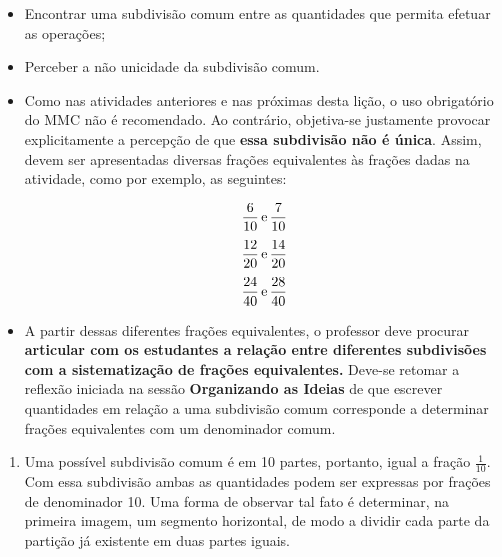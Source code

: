 \begin{multicols}{2}
\begin{solucao}{}{}
\end{solucao}
\Bg

\begin{objetivos}[label=chap5-ativ5]{}{}

  \begin{itemize} %
    \item       Encontrar uma subdivisão comum entre as quantidades que permita efetuar as operações;
    \item       Perceber a não unicidade da subdivisão comum.
\end{itemize} %
\end{objetivos}

\begin{orientacoes}{}{}

  \begin{itemize} %
    \item       Como nas atividades anteriores e nas próximas desta lição, o uso obrigatório do MMC não é recomendado. Ao contrário, objetiva-se justamente provocar explicitamente a percepção de que       {\bf essa subdivisão não é única}. Assim, devem ser apresentadas diversas frações equivalentes às frações dadas na atividade, como por exemplo, as seguintes:

  $$\frac{6}{10} \,{\rm e} \, \frac{7}{10}$$
  $$\frac{12}{20} \,{\rm e} \, \frac{14}{20}$$
  $$\frac{24}{40} \,{\rm e} \, \frac{28}{40}$$

    \item       A partir dessas diferentes frações equivalentes, o professor deve procurar       {\bf articular com os estudantes a relação entre diferentes subdivisões com a sistematização de frações equivalentes.}       Deve-se retomar a reflexão iniciada na sessão       {\bf Organizando as Ideias}       de que escrever quantidades em relação a uma subdivisão comum corresponde a determinar frações equivalentes com um denominador comum.
\end{itemize} %
\end{orientacoes}


\begin{solucao}{}{}
\begin{enumerate} [\quad a)] %
    \item       Uma possível subdivisão comum é em 10 partes, portanto, igual a fração       $\frac{1}{10}$. Com essa subdivisão ambas as quantidades podem ser expressas por frações de denominador 10. Uma forma de observar tal fato é determinar, na primeira imagem, um segmento horizontal, de modo a dividir cada parte da partição já existente em duas partes iguais.


\end{enumerate}
\end{solucao}
\end{multicols}
